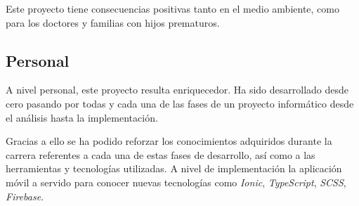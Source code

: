 \medskip
Este proyecto tiene consecuencias positivas tanto en el medio ambiente, como para los doctores
y familias con hijos prematuros.

\subsection{Personal}
A nivel personal, este proyecto resulta enriquecedor. Ha sido desarrollado desde cero
pasando por todas y cada una de las fases de un proyecto informático desde el análisis
hasta la implementación.

\medskip
Gracias a ello se ha podido reforzar los conocimientos adquiridos durante la carrera referentes
a cada una de estas fases de desarrollo, así como a las herramientas y tecnologías utilizadas. A
nivel de implementación la aplicación móvil a servido para conocer nuevas tecnologías como
\textit{Ionic}, \textit{TypeScript}, \textit{SCSS}, \textit{Firebase}.